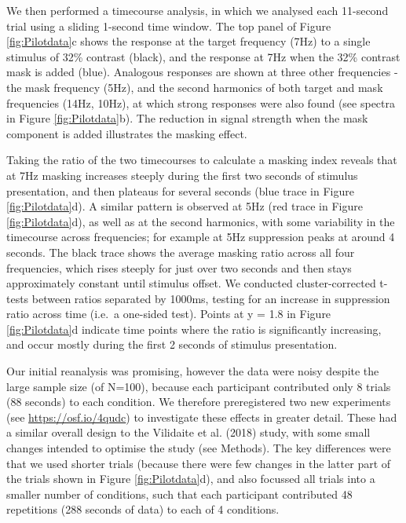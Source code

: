 \documentclass[
]{article}
\begin{document}
We then performed a timecourse analysis, in which we analysed each 11-second trial using a sliding 1-second time window. The top panel of Figure \ref{fig:Pilotdata}c shows the response at the target frequency (7Hz) to a single stimulus of 32\% contrast (black), and the response at 7Hz when the 32\% contrast mask is added (blue). Analogous responses are shown at three other frequencies - the mask frequency (5Hz), and the second harmonics of both target and mask frequencies (14Hz, 10Hz), at which strong responses were also found (see spectra in Figure \ref{fig:Pilotdata}b). The reduction in signal strength when the mask component is added illustrates the masking effect.

Taking the ratio of the two timecourses to calculate a masking index reveals that at 7Hz masking increases steeply during the first two seconds of stimulus presentation, and then plateaus for several seconds (blue trace in Figure \ref{fig:Pilotdata}d). A similar pattern is observed at 5Hz (red trace in Figure \ref{fig:Pilotdata}d), as well as at the second harmonics, with some variability in the timecourse across frequencies; for example at 5Hz suppression peaks at around 4 seconds. The black trace shows the average masking ratio across all four frequencies, which rises steeply for just over two seconds and then stays approximately constant until stimulus offset. We conducted cluster-corrected t-tests between ratios separated by 1000ms, testing for an increase in suppression ratio across time (i.e.~a one-sided test). Points at y = 1.8 in Figure \ref{fig:Pilotdata}d indicate time points where the ratio is significantly increasing, and occur mostly during the first 2 seconds of stimulus presentation.

Our initial reanalysis was promising, however the data were noisy despite the large sample size (of N=100), because each participant contributed only 8 trials (88 seconds) to each condition. We therefore preregistered two new experiments (see \url{https://osf.io/4qudc}) to investigate these effects in greater detail. These had a similar overall design to the Vilidaite et al. (2018) study, with some small changes intended to optimise the study (see Methods). The key differences were that we used shorter trials (because there were few changes in the latter part of the trials shown in Figure \ref{fig:Pilotdata}d), and also focussed all trials into a smaller number of conditions, such that each participant contributed 48 repetitions (288 seconds of data) to each of 4 conditions.
\end{document}
